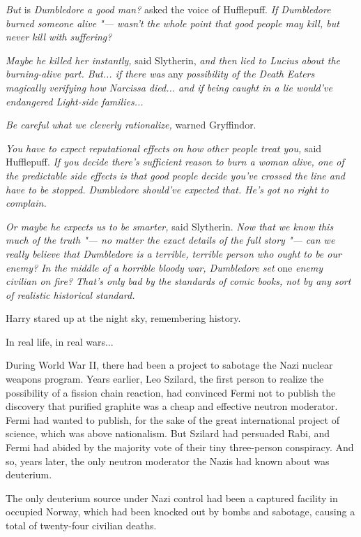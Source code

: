 \emph{But} is \emph{Dumbledore a good man?} asked the voice of
Hufflepuff. \emph{If Dumbledore burned someone alive "--- wasn't the whole
point that good people may kill, but never kill with suffering?}

\emph{Maybe he killed her instantly,} said Slytherin, \emph{and then
lied to Lucius about the burning-alive part. But... if there was}
any \emph{possibility of the Death Eaters magically verifying how
Narcissa died... and if being caught in a lie would've endangered
Light-side families...}

\emph{Be careful what we cleverly rationalize,} warned Gryffindor.

\emph{You have to expect reputational effects on how other people treat
you,} said Hufflepuff. \emph{If you decide there's sufficient reason to
burn a woman alive, one of the predictable side effects is that good
people decide you've crossed the line and have to be stopped. Dumbledore
should've expected that. He's got no right to complain.}

\emph{Or maybe he expects us to be smarter,} said Slytherin. \emph{Now
that we know this much of the truth "--- no matter the exact details of the
full story "--- can we really believe that Dumbledore is a terrible,
terrible person who ought to be our enemy? In the middle of a horrible
bloody war, Dumbledore set} one \emph{enemy civilian on fire? That's
only bad by the standards of comic books, not by any sort of realistic
historical standard.}

Harry stared up at the night sky, remembering history.

In real life, in real wars...

During World War II, there had been a project to sabotage the Nazi
nuclear weapons program. Years earlier, Leo Szilard, the first person to
realize the possibility of a fission chain reaction, had convinced Fermi
not to publish the discovery that purified graphite was a cheap and
effective neutron moderator. Fermi had wanted to publish, for the sake
of the great international project of science, which was above
nationalism. But Szilard had persuaded Rabi, and Fermi had abided by the
majority vote of their tiny three-person conspiracy. And so, years
later, the only neutron moderator the Nazis had known about was
deuterium.

The only deuterium source under Nazi control had been a captured
facility in occupied Norway, which had been knocked out by bombs and
sabotage, causing a total of twenty-four civilian deaths.

